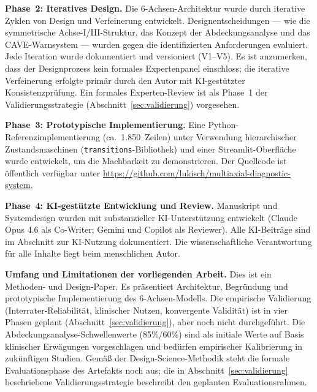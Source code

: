 \documentclass[11pt,a4paper]{article}
\begin{document}
\textbf{Phase~2: Iteratives Design.} Die 6-Achsen-Architektur wurde durch iterative Zyklen von Design und Verfeinerung entwickelt. Designentscheidungen --- wie die symmetrische Achse-I/III-Struktur, das Konzept der Abdeckungsanalyse und das CAVE-Warnsystem --- wurden gegen die identifizierten Anforderungen evaluiert. Jede Iteration wurde dokumentiert und versioniert (V1--V5). Es ist anzumerken, dass der Designprozess kein formales Expertenpanel einschloss; die iterative Verfeinerung erfolgte prim\"ar durch den Autor mit KI-gest\"utzter Konsistenzpr\"ufung. Ein formales Experten-Review ist als Phase~1 der Validierungsstrategie (Abschnitt~\ref{sec:validierung}) vorgesehen.

\textbf{Phase~3: Prototypische Implementierung.} Eine Python-Referenzimplementierung (ca.\ 1.850~Zeilen) unter Verwendung hierarchischer Zustandsmaschinen (\texttt{transitions}-Bibliothek) und einer Streamlit-Oberfl\"ache wurde entwickelt, um die Machbarkeit zu demonstrieren. Der Quellcode ist \"offentlich verf\"ugbar unter \url{https://github.com/lukisch/multiaxial-diagnostic-system}.

\textbf{Phase~4: KI-gest\"utzte Entwicklung und Review.} Manuskript und Systemdesign wurden mit substanzieller KI-Unterst\"utzung entwickelt (Claude Opus 4.6 als Co-Writer; Gemini und Copilot als Reviewer). Alle KI-Beitr\"age sind im Abschnitt zur KI-Nutzung dokumentiert. Die wissenschaftliche Verantwortung f\"ur alle Inhalte liegt beim menschlichen Autor.

\textbf{Umfang und Limitationen der vorliegenden Arbeit.} Dies ist ein Methoden- und Design-Paper. Es pr\"asentiert Architektur, Begr\"undung und prototypische Implementierung des 6-Achsen-Modells. Die empirische Validierung (Interrater-Reliabilit\"at, klinischer Nutzen, konvergente Validit\"at) ist in vier Phasen geplant (Abschnitt~\ref{sec:validierung}), aber noch nicht durchgef\"uhrt. Die Abdeckungsanalyse-Schwellenwerte (85\%/60\%) sind als initiale Werte auf Basis klinischer Erw\"agungen vorgeschlagen und bed\"urfen empirischer Kalibrierung in zuk\"unftigen Studien. Gem\"a\ss{} der Design-Science-Methodik \citep{Hevner2004, Peffers2007} steht die formale Evaluationsphase des Artefakts noch aus; die in Abschnitt~\ref{sec:validierung} beschriebene Validierungsstrategie beschreibt den geplanten Evaluationsrahmen.
\end{document}
